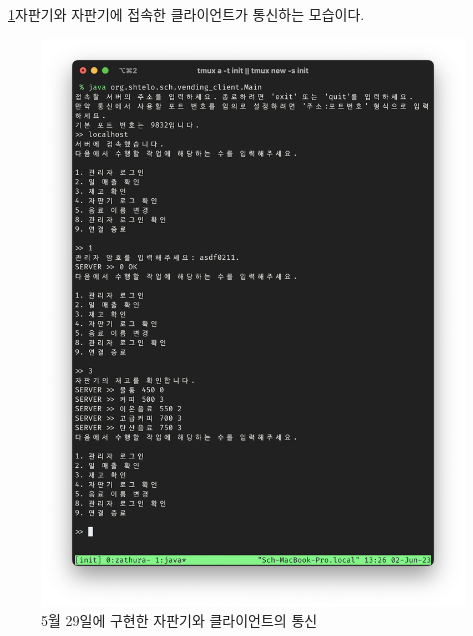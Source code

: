 \documentclass{oblivoir}
\newcommand{\figref}[1]{\figurename~\ref{#1}}
\begin{document}
    \figref{fig:0529-client}\는 자판기와 자판기에 접속한 클라이언트가 통신하는 모습이다.
    \begin{figure}[h]
        \centering
        \includegraphics[width=\textwidth]{images/dev-snapshop/0529-client}
        \caption{5월 29일에 구현한 자판기와 클라이언트의 통신}
        \label{fig:0529-client}
    \end{figure}
\end{document}
